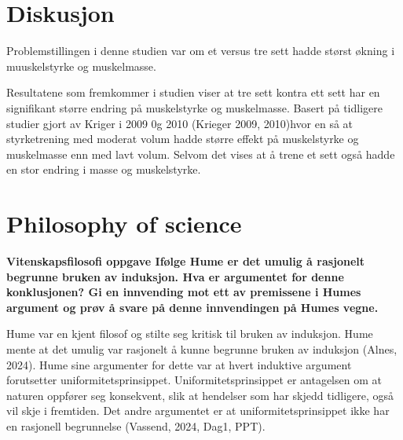 \documentclass[
  letterpaper,
  DIV=11,
  numbers=noendperiod]{scrreprt}
\begin{document}

\chapter{Diskusjon}\label{diskusjon-4}

Problemstillingen i denne studien var om et versus tre sett hadde størst
økning i muuskelstyrke og muskelmasse.

Resultatene som fremkommer i studien viser at tre sett kontra ett sett
har en signifikant større endring på muskelstyrke og muskelmasse. Basert
på tidligere studier gjort av Kriger i 2009 0g 2010 (Krieger 2009,
2010)hvor en så at styrketrening med moderat volum hadde større effekt
på muskelstyrke og muskelmasse enn med lavt volum. Selvom det vises at å
trene et sett også hadde en stor endring i masse og muskelstyrke.


\chapter{Philosophy of science}\label{philosophy-of-science}

\textbf{Vitenskapsfilosofi oppgave Ifølge Hume er det umulig å rasjonelt
begrunne bruken av induksjon. Hva er argumentet for denne konklusjonen?
Gi en innvending mot ett av premissene i Humes argument og prøv å svare
på denne innvendingen på Humes vegne.}

Hume var en kjent filosof og stilte seg kritisk til bruken av induksjon.
Hume mente at det umulig var rasjonelt å kunne begrunne bruken av
induksjon (Alnes, 2024). Hume sine argumenter for dette var at hvert
induktive argument forutsetter uniformitetsprinsippet.
Uniformitetsprinsippet er antagelsen om at naturen oppfører seg
konsekvent, slik at hendelser som har skjedd tidligere, også vil skje i
fremtiden. Det andre argumentet er at uniformitetsprinsippet ikke har en
rasjonell begrunnelse (Vassend, 2024, Dag1, PPT).
\end{document}
